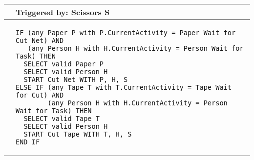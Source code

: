 \begin{longtable}{@{}>{\raggedright\arraybackslash}p{0.25cm}>{\raggedright\arraybackslash}p{13cm}@{}}
  \toprule
   & Triggered by: Scissors S\\ \midrule 
  &
\begin{lstlisting}[language=CMPseudo]
IF (any Paper P with P.CurrentActivity = Paper Wait for Cut Net) AND
   (any Person H with H.CurrentActivity = Person Wait for Task) THEN
  SELECT valid Paper P
  SELECT valid Person H
  START Cut Net WITH P, H, S
ELSE IF (any Tape T with T.CurrentActivity = Tape Wait for Cut) AND
        (any Person H with H.CurrentActivity = Person Wait for Task) THEN
  SELECT valid Tape T
  SELECT valid Person H
  START Cut Tape WITH T, H, S
END IF
\end{lstlisting}
  \\ \bottomrule
  \end{longtable}